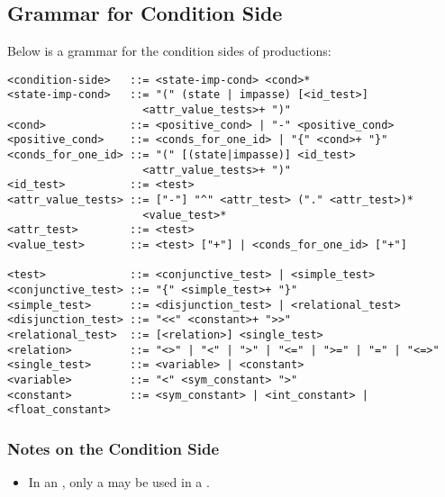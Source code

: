 \subsection{Grammar for Condition Side}
\label{SYNTAX-pm-condgrammar}

Below is a grammar for the condition sides of productions:
\begin{verbatim}
<condition-side>   ::= <state-imp-cond> <cond>*
<state-imp-cond>   ::= "(" (state | impasse) [<id_test>]
                     <attr_value_tests>+ ")"
<cond>             ::= <positive_cond> | "-" <positive_cond>
<positive_cond>    ::= <conds_for_one_id> | "{" <cond>+ "}"
<conds_for_one_id> ::= "(" [(state|impasse)] <id_test> 
                     <attr_value_tests>+ ")"
<id_test>          ::= <test>
<attr_value_tests> ::= ["-"] "^" <attr_test> ("." <attr_test>)*
                     <value_test>*
<attr_test>        ::= <test>
<value_test>       ::= <test> ["+"] | <conds_for_one_id> ["+"]  

<test>             ::= <conjunctive_test> | <simple_test>
<conjunctive_test> ::= "{" <simple_test>+ "}"
<simple_test>      ::= <disjunction_test> | <relational_test>
<disjunction_test> ::= "<<" <constant>+ ">>"
<relational_test>  ::= [<relation>] <single_test>
<relation>         ::= "<>" | "<" | ">" | "<=" | ">=" | "=" | "<=>"
<single_test>      ::= <variable> | <constant>
<variable>         ::= "<" <sym_constant> ">"
<constant>         ::= <sym_constant> | <int_constant> | <float_constant>
\end{verbatim}

\subsubsection*{Notes on the Condition Side}\vspace{-12pt}
\begin{itemize}
\item In an , only a  may be used in a .
\end{itemize}




